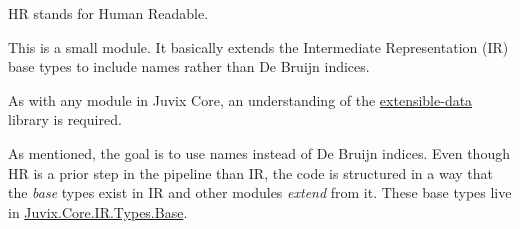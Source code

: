 \documentclass[acmsmall]{acmart}
\numberwithin{figure}{subsection}
\begin{document}
HR stands for Human Readable.

This is a small module. It basically extends the Intermediate Representation (IR) base types to include names rather than De Bruijn indices.

As with any module in Juvix Core, an understanding of the \href{https://heliaxdev.github.io/extensible-data/Extensible.html}{extensible-data} library is required.

As mentioned, the goal is to use names instead of De Bruijn indices. Even though HR is a prior step in the pipeline than IR, the code is structured in a way that the \textit{base} types exist in IR and other modules \textit{extend} from it. These base types live in \href{https://github.com/heliaxdev/juvix/blob/develop/library/Core/src/Juvix/Core/IR/Types/Base.hs}{Juvix.Core.IR.Types.Base}. 
    
\end{document}
